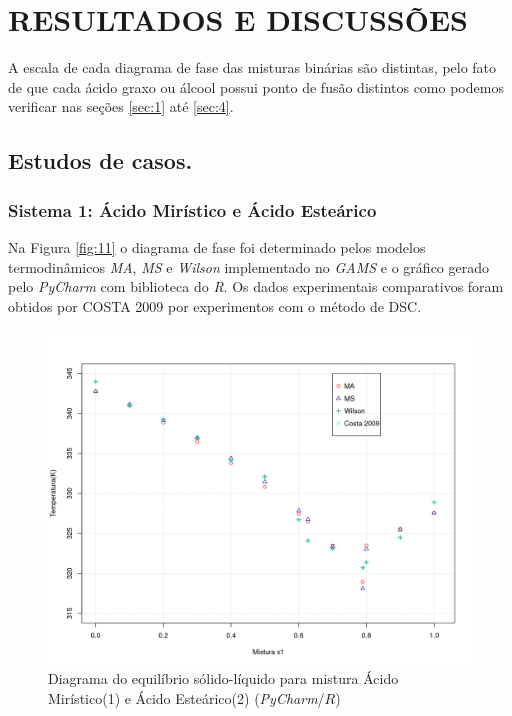 \chapter{RESULTADOS E DISCUSSÕES}\label{chap:resultados}

A escala de cada diagrama de fase das misturas binárias são distintas, pelo fato de que cada ácido graxo ou álcool possui ponto de fusão distintos como podemos verificar nas seções \ref{sec:1} até \ref{sec:4}.

\section{Estudos de casos.}

\subsection{Sistema 1: Ácido Mirístico e Ácido Esteárico}\label{sistema1}

Na Figura \ref{fig:11} o diagrama de fase foi determinado pelos modelos termodinâmicos \textit{MA}, \textit{MS} e \textit{Wilson} implementado no \textit{GAMS} e o gráfico gerado pelo \textit{PyCharm} com biblioteca do \textit{R}. Os dados experimentais comparativos foram obtidos por COSTA 2009 por experimentos com o método de DSC.
\begin{figure}[H]
	\centering
	\includegraphics[width=1.06\linewidth 
	]{dados/figuras/Miristico_estearico.png}
	\caption[Diagrama do equilíbrio sólido-líquido para mistura Ácido Mirístico e Ácido Esteárico]{Diagrama do equilíbrio sólido-líquido para mistura Ácido Mirístico(1) e Ácido Esteárico(2) (\textit{PyCharm}/$R$)}
	\label{fig:3}
\end{figure}

